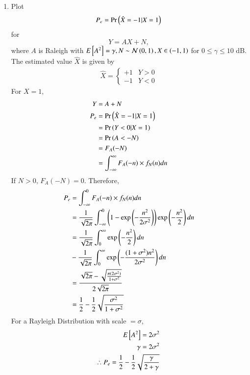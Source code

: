 \begin{enumerate}[label=\thesection.\arabic*.,ref=\thesection.\theenumi]
\item
\label{ch4_sim}
Plot 
\begin{equation}
P_e = \Pr\left(\hat{X} = -1|X=1\right)
\end{equation}
%
for 
\begin{equation}
Y = AX+N,
\end{equation}
where $A$ is Raleigh with $E{}\left[A^2\right] = \gamma, N \sim \mathcal{N}\left(0,1\right), X \in \left(-1,1\right)$ for $0 \le \gamma \le 10$ dB.
\\
\solution The estimated value $\hat{X}$ is given by
\begin{align}
\hat{X} = 
\begin{cases}
+1 & Y>0\\
-1 & Y<0
\end{cases}
\end{align}
For $X = 1$, 
\begin{align}
Y &= A + N\\
P_e &= \Pr\left(\hat{X} = -1|X=1\right) \\
&= \Pr\left(Y<0 |X=1\right)\\
&= \Pr\left(A<-N\right)\\
&= F_A(-N)\\
&= \int_{-\infty}^{\infty} F_A(-n) \times f_N(n) dn
\end{align}
If $N>0$, $F_A(-N) = 0$. Therefore,
\begin{align}
P_e &= \int_{-\infty}^{0} F_A(-n) \times f_N(n) dn\\
&= \frac{1}{\sqrt{2\pi}}\int_{-\infty}^{0} \left(1-\exp \left( -\frac{n^2}{2\sigma^2} \right) \right)\exp \left( -\frac{n^2}{2} \right) dn\\
&= \frac{1}{\sqrt{2\pi}} \int_{0}^{\infty} \exp \left( -\frac{n^2}{2} \right)dn \nonumber \\
&- \frac{1}{\sqrt{2\pi}} \int_{0}^{\infty} \exp \left( -\frac{(1+ \sigma^2)n^2}{2 \sigma^2} \right) dn\\
&= \frac{\sqrt{2\pi} - \sqrt{\frac{\pi(2\sigma^2)}{1+\sigma^2}}}{2\sqrt{2\pi}}\\
&= \frac{1}{2} - \frac{1}{2}\sqrt{\frac{\sigma^2}{1+\sigma^2}}
\end{align}
For a Rayleigh Distribution with scale $= \sigma$,
\begin{align}
E\sbrak{A^2} = 2\sigma^2\\
\gamma = 2\sigma^2\\
\therefore P_e = \frac{1}{2} - \frac{1}{2}\sqrt{\frac{\gamma}{2+\gamma}}

\end{align}
\end{enumerate}
